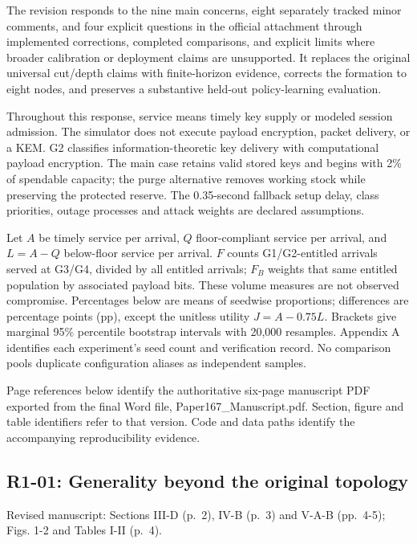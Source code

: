 The revision responds to the nine main concerns, eight separately tracked minor comments, and four explicit questions in the official attachment through implemented corrections, completed comparisons, and explicit limits where broader calibration or deployment claims are unsupported. It replaces the original universal cut/depth claims with finite-horizon evidence, corrects the formation to eight nodes, and preserves a substantive held-out policy-learning evaluation.

Throughout this response, service means timely key supply or modeled session admission. The simulator does not execute payload encryption, packet delivery, or a KEM. G2 classifies information-theoretic key delivery with computational payload encryption. The main case retains valid stored keys and begins with 2\% of spendable capacity; the purge alternative removes working stock while preserving the protected reserve. The 0.35-second fallback setup delay, class priorities, outage processes and attack weights are declared assumptions.

Let \(A\) be timely service per arrival, \(Q\) floor-compliant service per arrival, and \(L=A-Q\) below-floor service per arrival. \(F\) counts G1/G2-entitled arrivals served at G3/G4, divided by all entitled arrivals; \(F_B\) weights that same entitled population by associated payload bits. These volume measures are not observed compromise. Percentages below are means of seedwise proportions; differences are percentage points (pp), except the unitless utility \(J=A-0.75L\). Brackets give marginal 95\% percentile bootstrap intervals with 20,000 resamples. Appendix A identifies each experiment's seed count and verification record. No comparison pools duplicate configuration aliases as independent samples.

Page references below identify the authoritative six-page manuscript PDF exported from the final Word file, Paper167\_Manuscript.pdf. Section, figure and table identifiers refer to that version. Code and data paths identify the accompanying reproducibility evidence.

\subsection{R1-01: Generality beyond the original topology}\label{r1-01-generality-beyond-the-original-topology}

Revised manuscript: Sections III-D (p.~2), IV-B (p.~3) and V-A-B (pp.~4-5); Figs. 1-2 and Tables I-II (p.~4).

